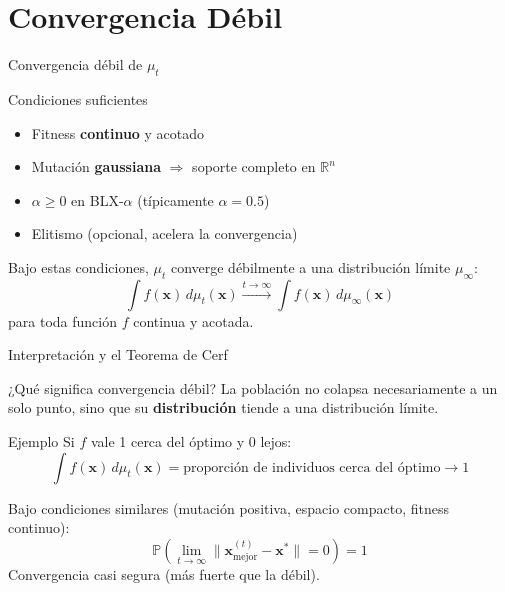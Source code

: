 \documentclass[10pt, aspectratio=169]{beamer}
\begin{document}
\section{Convergencia Débil}

\begin{frame}{Convergencia débil de $\mu_t$}
\begin{block}{Condiciones suficientes}
\begin{itemize}
    \item Fitness \textbf{continuo} y acotado
    \item Mutación \textbf{gaussiana} $\Rightarrow$ \alert{soporte completo} en $\mathbb{R}^n$
    \item $\alpha \ge 0$ en BLX-$\alpha$ (típicamente $\alpha = 0.5$)
    \item Elitismo (opcional, acelera la convergencia)
\end{itemize}
\end{block}

\begin{theorem}
Bajo estas condiciones, $\mu_t$ converge débilmente a una distribución límite $\mu_\infty$:
\[
\int f(\mathbf{x})\, d\mu_t(\mathbf{x}) \xrightarrow{t \to \infty} \int f(\mathbf{x})\, d\mu_\infty(\mathbf{x})
\]
para toda función $f$ continua y acotada.
\end{theorem}
\end{frame}

\begin{frame}{Interpretación y el Teorema de Cerf}
\begin{block}{¿Qué significa convergencia débil?}
La población no colapsa necesariamente a un solo punto, sino que su \textbf{distribución} tiende a una distribución límite.
\end{block}

\begin{block}{Ejemplo}
Si $f$ vale 1 cerca del óptimo y 0 lejos:
\[
\int f(\mathbf{x})\, d\mu_t(\mathbf{x}) = \text{proporción de individuos cerca del óptimo} \to 1
\]
\end{block}

\begin{theorem}[Cerf, 1998]
Bajo condiciones similares (mutación positiva, espacio compacto, fitness continuo):
\[
\mathbb{P}\left( \lim_{t \to \infty} \|\mathbf{x}_{\text{mejor}}^{(t)} - \mathbf{x}^*\| = 0 \right) = 1
\]
\alert{Convergencia casi segura} (más fuerte que la débil).
\end{theorem}
\end{frame}
\end{document}
